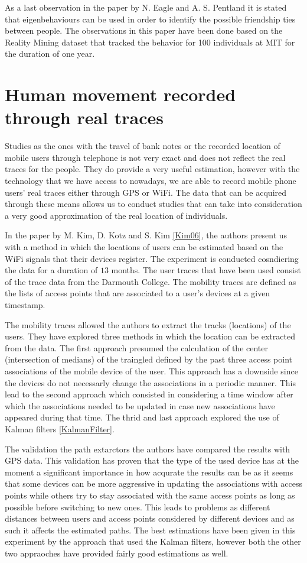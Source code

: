 As a last observation in the paper by N. Eagle and A. S. Pentland it is stated
that eigenbehaviours can be used in order to identify the possible friendship
ties between people. The observations in this paper have been done based on the
Reality Mining dataset that tracked the behavior for 100 individuals at MIT for
the duration of one year.

\section{Human movement recorded through real traces}
Studies as the ones with the travel of bank notes or the recorded location of
mobile users through telephone is not very exact and does not reflect the real
traces for the people. They do provide a very useful estimation, however with
the technology that we have access to nowadays, we are able to record mobile
phone users' real traces either through GPS or WiFi. The data that can be
acquired through these means allows us to conduct studies that can take into
consideration a very good approximation of the real location of individuals.

In the paper by M. Kim, D. Kotz and S. Kim \ref{Kim06}, the authors present us
with a method in which the locations of users can be estimated based on the WiFi
signals that their devices register. The experiment is conducted cosndiering the
data for a duration of $13$ months. The user traces that have been used consist
of the trace data from the Darmouth College. The mobility traces are defined as
the lists of access points that are associated to a user's devices at a given
timestamp. 

The mobility traces allowed the authors to extract the tracks (locations) of the
users. They have explored three methods in which the location can be extracted
from the data. The first approach presumed the calculation of the center
(intersection of medians) of the traingled defined by the past three access
point associations of the mobile device of the user. This approach has a
downside since the devices do not necessarly change the associations in a
periodic manner. This lead to the second approach which consisted in considering
a time window after which the associations needed to be updated in case new
associations have appeared during that time. The thrid and last approach
explored the use of Kalman
filters \ref{KalmanFilter}.

The validation the path extarctors the authors have compared the results with
GPS data. This validation has proven that the type of the used device has at the
moment a significant importance in how acqurate the results can be as it seems
that some devices can be more aggressive in updating the associations with
access points while others try to stay associated with the same access points as
long as possible before switching to new ones. This leads to problems as
different distances between users and access points considered by different
devices and as such it affects the estimated paths. The best estimations have
been given in this experiment by the approach that used the Kalman filters,
however both the other two appraoches have provided fairly good estimations as
well.

